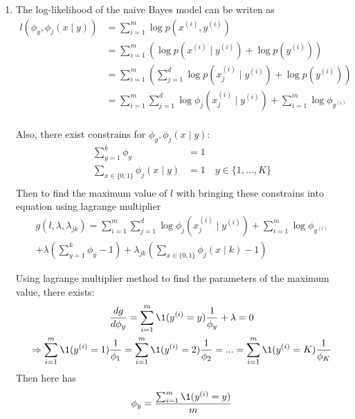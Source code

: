 \documentclass[a4paper]{article}
\begin{document}
\begin{enumerate}
  \setlength{\itemsep}{3\parskip}
\item The log-likelihood of the naive Bayes model can be writen as  
\begin{equation*}
    \begin{aligned}
      l(\phi_y,\phi_j (x \mid y)) 
      &= \sum_{i = 1}^m \log p(x^{(i)}, y^{(i)})\\
      &= \sum_{i = 1}^m (\log p(x^{(i)} \mid y^{(i)}) + \log p(y^{(i)}))\\
      &= \sum_{i = 1}^m (\sum_{j = 1}^d \log p(x^{(i)}_j \mid y^{(i)}) + \log p(y^{(i)}))\\
      &= \sum_{i = 1}^m \sum_{j = 1}^d \log \phi_j (x^{(i)}_j \mid y^{(i)}) + \sum_{i = 1}^m \log \phi_{y^{(i)}}\\
    \end{aligned}
    \label{eq:svm:p}
  \end{equation*}

  Also, there exist constrains for $\phi_y,\phi_j (x \mid y)$:
  \begin{equation*}
    \begin{aligned}
      \sum_{y=1}^k \phi_y &= 1\\
      \sum_{x \in \{0,1\}} \phi_j (x \mid y) &= 1 \quad y \in \{1,...,K\}\\
    \end{aligned}
  \end{equation*}
Then to find the maximum value of $l$ with bringing these constrains into equation using lagrange multiplier
\begin{equation*}
  \begin{aligned}
    g(l, \lambda, \lambda_{jk}) = \sum_{i = 1}^m \sum_{j = 1}^d \log \phi_j (x^{(i)}_j \mid y^{(i)}) + \sum_{i = 1}^m \log \phi_{y^{(i)}} \\
      + \lambda(\sum_{y=1}^k\phi_y - 1) +\lambda_{jk}(\sum_{x \in \{0,1\}}\phi_j(x \mid k)-1)
  \end{aligned}
\end{equation*}

Using lagrange multiplier method to find the parameters of the maximum value, there exists:
\begin{equation*}
  \begin{gathered}
    \frac{dg}{d \phi_y} = \sum_{i = 1}^m \1 (y^{(i)}=y) \frac{1}{\phi_y} + \lambda = 0\\
    \Rightarrow \sum_{i = 1}^m \1 (y^{(i)}=1) \frac{1}{\phi_1}=\sum_{i = 1}^m \1 (y^{(i)}=2) \frac{1}{\phi_2}=...=\sum_{i = 1}^m \1 (y^{(i)}=K) \frac{1}{\phi_K}
  \end{gathered}
\end{equation*}
Then here has
\begin{equation*}
  \phi_y = \frac{\sum_{i = 1}^m \1 (y^{(i)}=y)}{m}
\end{equation*}


\end{enumerate}
\end{document}
